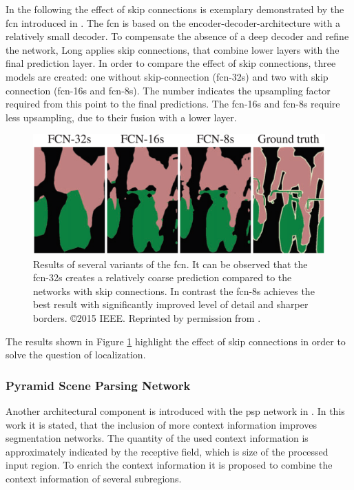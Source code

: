 In the following the effect of skip connections is exemplary demonstrated by the \gls{fcn} introduced in \cite{LSD15-FCN}.
The \gls{fcn} is based on the encoder-decoder-architecture with a relatively small decoder.
To compensate the absence of a deep decoder and refine the network, Long applies skip connections, that combine lower layers with the final prediction layer.
In order to compare the effect of skip connections, three models are created: one without skip-connection (\gls{fcn}-32s) and two with skip connection (\gls{fcn}-16s and \gls{fcn}-8s).
The number indicates the upsampling factor required from this point to the final predictions.
The \gls{fcn}-16s and \gls{fcn}-8s require less upsampling, due to their fusion with a lower layer.
\begin{figure}
	\includegraphics[width=\linewidth]{figures/chap223_fcn_results.png}	
	\caption[FCN Predictions]{
		Results of several variants of the \gls{fcn}. 
		It can be observed that the \gls{fcn}-32s creates a relatively coarse prediction compared to the networks with skip connections.
		In contrast the \gls{fcn}-8s achieves the best result with significantly improved level of detail and sharper borders.
		\copyright 2015 IEEE. Reprinted by permission from \cite{LSD15-FCN}.}
	\label{fig:ch2:sec2:fcn_res}
\end{figure}
The results shown in Figure \ref{fig:ch2:sec2:fcn_res} highlight the effect of skip connections in order to solve the question of localization.

\subsubsection{Pyramid Scene Parsing Network}

Another architectural component is introduced with the \gls{psp} network in \cite{Zhao17-PSP}.
In this work it is stated, that the inclusion of more context information improves segmentation networks.
The quantity of the used context information is approximately indicated by the receptive field, which is size of the processed input region.
To enrich the context information it is proposed to combine the context information of several subregions.

